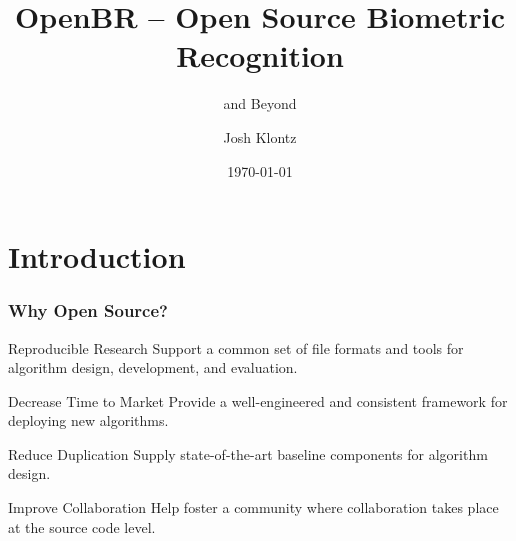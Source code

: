 \documentclass[12pt]{beamer}
\title[OpenBR]{OpenBR -- Open Source Biometric Recognition}
\subtitle{and Beyond}
\author[J. Klontz]{Josh Klontz}
\institute[] { \small \emph{www.openbiometrics.org} }
\date{\today}
\begin{document}
\begin{frame}
\titlepage
\end{frame}

\section{Introduction}
\begin{frame}
\frametitle{Why Open Source?}
\pause
\begin{block}{Reproducible Research}
Support a common set of file formats and tools for algorithm design, development, and evaluation.
\end{block}
\pause
\begin{block}{Decrease Time to Market}
Provide a well-engineered and consistent framework for deploying new algorithms.
\end{block}
\pause
\begin{block}{Reduce Duplication}
Supply state-of-the-art baseline components for algorithm design.
\end{block}
\pause
\begin{block}{Improve Collaboration}
Help foster a community where collaboration takes place at the source code level.
\end{block}
\end{frame}
\end{document}
